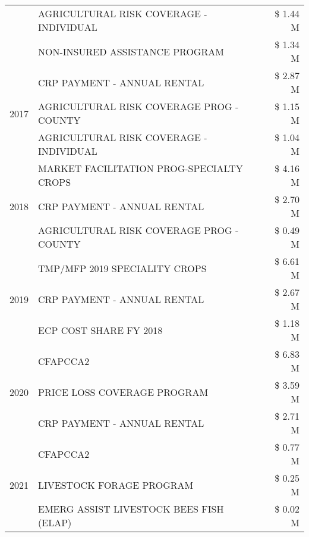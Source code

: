 \begin{tabular}{llr}
 & AGRICULTURAL RISK COVERAGE - INDIVIDUAL & \$ 1.44 M \\
 & NON-INSURED ASSISTANCE PROGRAM & \$ 1.34 M \\
\cline{1-3}
\multirow[t]{3}{*}{2017} & CRP PAYMENT - ANNUAL RENTAL & \$ 2.87 M \\
 & AGRICULTURAL RISK COVERAGE PROG - COUNTY & \$ 1.15 M \\
 & AGRICULTURAL RISK COVERAGE - INDIVIDUAL & \$ 1.04 M \\
\cline{1-3}
\multirow[t]{3}{*}{2018} & MARKET FACILITATION PROG-SPECIALTY CROPS & \$ 4.16 M \\
 & CRP PAYMENT - ANNUAL RENTAL & \$ 2.70 M \\
 & AGRICULTURAL RISK COVERAGE PROG - COUNTY & \$ 0.49 M \\
\cline{1-3}
\multirow[t]{3}{*}{2019} & TMP/MFP 2019 SPECIALITY CROPS & \$ 6.61 M \\
 & CRP PAYMENT - ANNUAL RENTAL & \$ 2.67 M \\
 & ECP COST SHARE FY 2018 & \$ 1.18 M \\
\cline{1-3}
\multirow[t]{3}{*}{2020} & CFAPCCA2 & \$ 6.83 M \\
 & PRICE LOSS COVERAGE PROGRAM & \$ 3.59 M \\
 & CRP PAYMENT - ANNUAL RENTAL & \$ 2.71 M \\
\cline{1-3}
\multirow[t]{3}{*}{2021} & CFAPCCA2 & \$ 0.77 M \\
 & LIVESTOCK FORAGE PROGRAM & \$ 0.25 M \\
 & EMERG ASSIST LIVESTOCK BEES FISH (ELAP) & \$ 0.02 M \\
\cline{1-3}
\bottomrule
\end{tabular}
